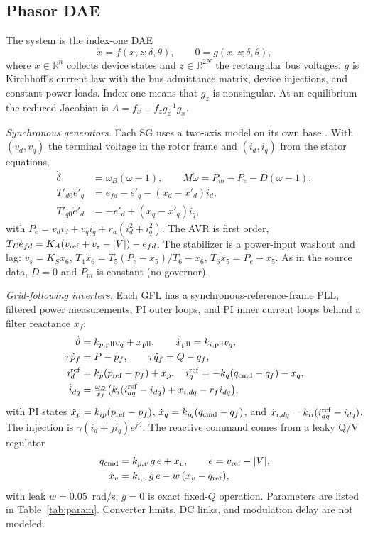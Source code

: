 \documentclass[journal]{IEEEtran}
\theoremstyle{definition}
\theoremstyle{remark}
\newcommand{\RR}{\mathbb{R}}
\begin{document}
\subsection{Phasor DAE}
The system is the index-one DAE
\begin{equation}\label{eq:dae}
\dot x = f(x,z;\delta,\theta),\qquad 0 = g(x,z;\delta,\theta),
\end{equation}
where $x\in\RR^{n}$ collects device states and $z\in\RR^{2N}$ the rectangular
bus voltages. $g$ is Kirchhoff's current law with the bus admittance matrix,
device injections, and constant-power loads. Index one means that $g_z$ is
nonsingular. At an equilibrium the reduced Jacobian is
$A=f_x-f_z g_z^{-1} g_x$.

\emph{Synchronous generators.} Each SG uses a two-axis model on its own base
\cite{sauer1998}. With $(v_d,v_q)$ the terminal voltage in the rotor frame and
$(i_d,i_q)$ from the stator equations,
\begin{align}
\dot\delta&=\omega_B(\omega-1),\qquad
M\dot\omega=P_m-P_e-D(\omega-1),\label{eq:swing}\\
T'_{d0}\dot e'_q&=e_{fd}-e'_q-(x_d-x'_d)i_d,\nonumber\\
T'_{q0}\dot e'_d&=-e'_d+(x_q-x'_q)i_q,\nonumber
\end{align}
with $P_e=v_di_d+v_qi_q+r_a(i_d^2+i_q^2)$. The AVR is first order,
$T_E\dot e_{fd}=K_A(v_{\rm ref}+v_s-|V|)-e_{fd}$. The stabilizer is a
power-input washout and lag: $v_s=K_Sx_6$, $T_4\dot x_6=T_5(P_e-x_5)/T_6-x_6$,
$T_6\dot x_5=P_e-x_5$. As in the source data, $D=0$ and $P_m$ is constant (no
governor).

\emph{Grid-following inverters.} Each GFL has a synchronous-reference-frame
PLL, filtered power measurements, PI outer loops, and PI inner current loops
behind a filter reactance $x_f$:
\begin{align}
\dot\vartheta&=k_{p,\rm pll}v_q+x_{\rm pll},\qquad \dot x_{\rm pll}=k_{i,\rm pll}v_q,
\label{eq:pll}\\
\tau\dot p_f&=P-p_f,\qquad \tau\dot q_f=Q-q_f,\nonumber\\
i_d^{\rm ref}&=k_p(p_{\rm ref}-p_f)+x_p,\quad
i_q^{\rm ref}=-k_q(q_{\rm cmd}-q_f)-x_q,\nonumber\\
\dot i_{dq}&=\tfrac{\omega_B}{x_f}\big(k_i(i_{dq}^{\rm ref}-i_{dq})+x_{i,dq}-r_fi_{dq}\big),
\nonumber
\end{align}
with PI states $\dot x_p=k_{ip}(p_{\rm ref}-p_f)$,
$\dot x_q=k_{iq}(q_{\rm cmd}-q_f)$, and $\dot x_{i,dq}=k_{ii}(i^{\rm ref}_{dq}-i_{dq})$.
The injection is $\gamma(i_d+ji_q)e^{j\vartheta}$. The reactive command comes
from a leaky Q/V regulator
\begin{align}
q_{\rm cmd}&=k_{p,v}\,g\,e+x_v,\qquad e=v_{\rm ref}-|V|,\label{eq:qv}\\
\dot x_v&= k_{i,v}\,g\,e-w\,(x_v-q_{\rm ref}),\nonumber
\end{align}
with leak $w=0.05$~rad/s; $g=0$ is exact fixed-$Q$ operation. Parameters are
listed in Table~\ref{tab:param}. Converter limits, DC links, and modulation
delay are not modeled.
\end{document}
